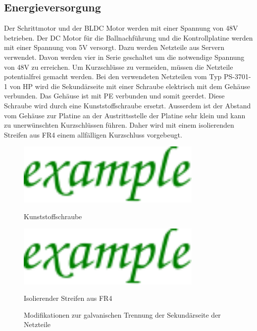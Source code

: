 \subsection{Energieversorgung}
Der Schrittmotor und der BLDC Motor werden mit einer Spannung von 48\si{\volt} 
betrieben. Der DC Motor für die Ballnachführung und die Kontrollplatine werden 
mit einer Spannung von 5\si{\volt} versorgt. Dazu werden Netzteile aus Servern 
verwendet. Davon werden vier in Serie geschaltet um die notwendige Spannung 
von 48\si{\volt} zu erreichen. Um Kurzschlüsse zu vermeiden, müssen die 
Netzteile potentialfrei gemacht werden. Bei den verwendeten Netzteilen vom Typ 
PS-3701-1 von HP wird die Sekundärseite mit einer Schraube elektrisch mit dem 
Gehäuse verbunden. Das Gehäuse ist mit PE verbunden und somit geerdet. Diese 
Schraube wird durch eine Kunststoffschraube ersetzt. Ausserdem ist der Abstand 
vom Gehäuse zur Platine an der Austrittsstelle der Platine sehr klein und kann 
zu unerwünschten Kurzschlüssen führen. Daher wird mit einem isolierenden 
Streifen aus FR4 einem allfälligen Kurzschluss vorgebeugt. 
\begin{figure}[h!]
    \begin{minipage}{0.5\textwidth}
        \centering
        \includegraphics[width=0.8\textwidth]{../example/fig/example.pdf}
        \caption*{Kunststoffschraube}
        \label{fig:e_sup_mod_screw}
    \end{minipage}
    \begin{minipage}{0.5\textwidth}
        \centering
        \includegraphics[width=0.8\textwidth]{../example/fig/example.pdf}
        \caption*{Isolierender Streifen aus FR4}
        \label{fig:e_sup_mod_strip}
    \end{minipage}
    \caption{Modifikationen zur galvanischen Trennung der Sekundärseite der Netzteile}
    \label{fig:e_sup_mod}
\end{figure}
